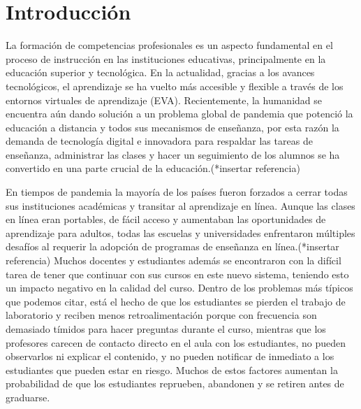 \chapter*{Introducción}\label{chapter:introduction}
La formación de competencias profesionales es un aspecto fundamental en el proceso de instrucción en las 
instituciones educativas, principalmente en la educación superior y tecnológica. En la actualidad, 
gracias a los avances tecnológicos, el aprendizaje se ha vuelto más accesible y flexible a través de 
los entornos virtuales de aprendizaje (EVA). Recientemente, la humanidad se encuentra aún dando 
solución a un problema global de pandemia que potenció la educación a distancia y todos sus mecanismos 
de enseñanza, por esta razón la demanda de tecnología digital e innovadora para respaldar las tareas de 
enseñanza, administrar las clases y hacer un seguimiento de los alumnos se ha convertido en una parte 
crucial de la educación.(*insertar referencia) 

En tiempos de pandemia la mayoría de los países fueron forzados a cerrar todas sus instituciones académicas 
y transitar al aprendizaje en línea. Aunque las clases en línea eran portables, de fácil acceso 
y aumentaban las oportunidades de aprendizaje para adultos, todas las escuelas y universidades enfrentaron 
múltiples desafíos al requerir la adopción de programas de enseñanza en línea.(*insertar referencia) Muchos 
docentes y estudiantes además se encontraron con la difícil tarea de tener que continuar con sus cursos 
en este nuevo sistema, teniendo esto un impacto negativo en la calidad del curso. Dentro de los problemas más típicos que 
podemos citar, está el hecho de que los estudiantes se pierden el trabajo de laboratorio y reciben 
menos retroalimentación porque con frecuencia son demasiado tímidos para hacer preguntas durante el curso, 
mientras que los profesores carecen de contacto directo en el aula con los estudiantes, no pueden 
observarlos ni explicar el contenido, y no pueden notificar de inmediato a los estudiantes que pueden 
estar en riesgo. Muchos de estos factores aumentan la probabilidad de que los estudiantes reprueben, 
abandonen y se retiren antes de graduarse. 


